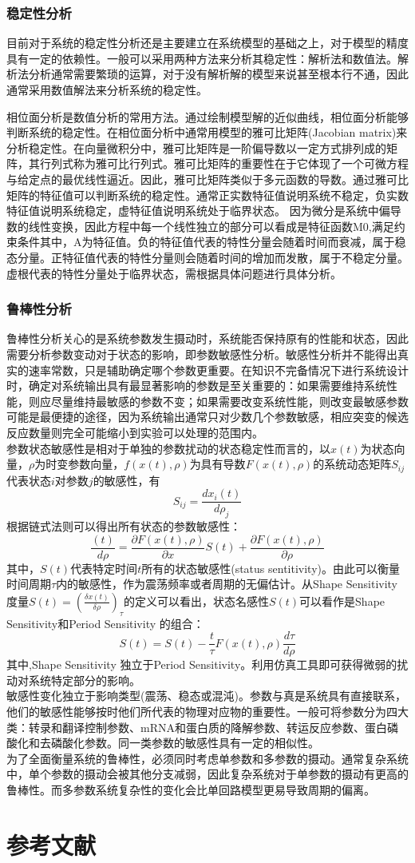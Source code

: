 \documentclass[withoutpreface,bwprint]{cumcmthesis} %
\begin{document}
\subsubsection{稳定性分析}
目前对于系统的稳定性分析还是主要建立在系统模型的基础之上，对于模型的精度具有一定的依赖性。一般可以采用两种方法来分析其稳定性：解析法和数值法。解析法分析通常需要繁琐的运算，对于没有解析解的模型来说甚至根本行不通，因此通常采用数值解法来分析系统的稳定性。

相位面分析是数值分析的常用方法。通过绘制模型解的近似曲线，相位面分析能够判断系统的稳定性。在相位面分析中通常用模型的雅可比矩阵(Jacobian matrix)来分析稳定性。在向量微积分中，雅可比矩阵是一阶偏导数以一定方式排列成的矩阵，其行列式称为雅可比行列式。雅可比矩阵的重要性在于它体现了一个可微方程与给定点的最优线性逼近。因此，雅可比矩阵类似于多元函数的导数。通过雅可比矩阵的特征值可以判断系统的稳定性。通常正实数特征值说明系统不稳定，负实数特征值说明系统稳定，虚特征值说明系统处于临界状态。
因为微分是系统中偏导数的线性变换，因此方程中每一个线性独立的部分可以看成是特征函数M0,满足约束条件其中，A为特征值。负的特征值代表的特性分量会随着时间而衰减，属于稳态分量。正特征值代表的特性分量则会随着时间的增加而发散，属于不稳定分量。虚根代表的特性分量处于临界状态，需根据具体问题进行具体分析。
\subsubsection{鲁棒性分析}
鲁棒性分析关心的是系统参数发生摄动时，系统能否保持原有的性能和状态，因此需要分析参数变动对于状态的影响，即参数敏感性分析。敏感性分析并不能得出真实的速率常数，只是辅助确定哪个参数更重要。在知识不完备情况下进行系统设计时，确定对系统输出具有最显著影响的参数是至关重要的：如果需要维持系统性能，则应尽量维持最敏感的参数不变；如果需要改变系统性能，则改变最敏感参数可能是最便捷的途径，因为系统输出通常只对少数几个参数敏感，相应突变的候选反应数量则完全可能缩小到实验可以处理的范围内。\\
参数状态敏感性是相对于单独的参数扰动的状态稳定性而言的，以$x(t)$为状态向量，$\rho$为时变参数向量，$f(x(t),\rho)$为具有导数$F(x(t),\rho)$的系统动态矩阵$S_{ij}$代表状态$i$对参数$j$的敏感性，有
$$S_{ij}=\frac{dx_i(t)}{d\rho_j}$$
根据链式法则可以得出所有状态的参数敏感性：
$$\frac{(t)}{d\rho}=\frac{\partial F(x(t),\rho)}{\partial x} S(t)+\frac{\partial F(x(t),\rho)}{\partial \rho}$$
其中，$S(t)$代表特定时间$t$所有的状态敏感性(status sentitivity)。由此可以衡量时间周期$\tau$内的敏感性，作为震荡频率或者周期的无偏估计。从Shape Sensitivity 度量$S(t) = (\frac{\delta x(t)}{\delta \rho})_\tau$的定义可以看出，状态名感性$S(t)$可以看作是Shape Sensitivity和Period Sensitivity 的组合：
$$S(t) = S(t)-\frac{t}{\tau}F(x(t),\rho)\frac{d\tau}{d\rho}$$
其中,Shape Sensitivity 独立于Period Sensitivity。利用仿真工具即可获得微弱的扰动对系统特定部分的影响。\\
敏感性变化独立于影响类型(震荡、稳态或混沌)。参数与真是系统具有直接联系，他们的敏感性能够按时他们所代表的物理对应物的重要性。一般可将参数分为四大类：转录和翻译控制参数、mRNA和蛋白质的降解参数、转运反应参数、蛋白磷酸化和去磷酸化参数。同一类参数的敏感性具有一定的相似性。\\
为了全面衡量系统的鲁棒性，必须同时考虑单参数和多参数的摄动。通常复杂系统中，单个参数的摄动会被其他分支减弱，因此复杂系统对于单参数的摄动有更高的鲁棒性。而多参数系统复杂性的变化会比单回路模型更易导致周期的偏离。
\section{参考文献}
\end{document}
